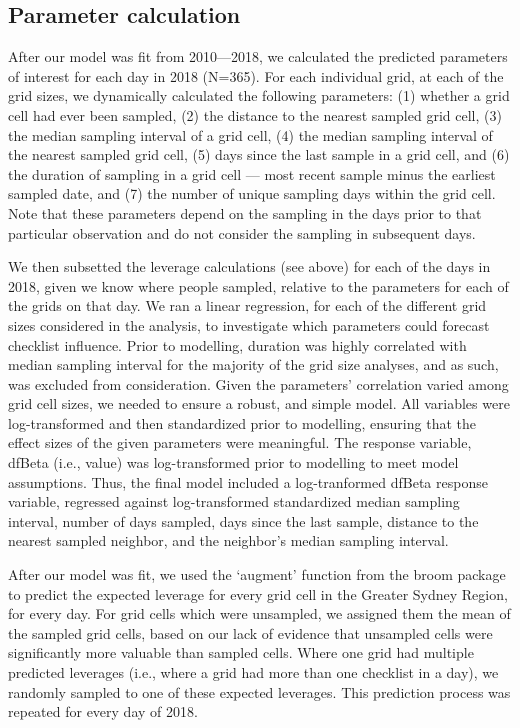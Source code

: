 \documentclass[9pt,twocolumn,twoside,lineno]{pnas-new}
\begin{document}
{\subsection*{Parameter calculation} After our model was fit from 2010---2018, we calculated the predicted parameters of interest for each day in 2018 (N=365). For each individual grid, at each of the grid sizes, we dynamically calculated the following parameters: (1) whether a grid cell had ever been sampled, (2) the distance to the nearest sampled grid cell, (3) the median sampling interval of a grid cell, (4) the median sampling interval of the nearest sampled grid cell, (5) days since the last sample in a grid cell, and (6) the duration of sampling in a grid cell --- most recent sample minus the earliest sampled date, and (7) the number of unique sampling days within the grid cell.  Note that  these parameters depend on the sampling in the days prior to that particular observation and do not consider the sampling in subsequent days.  

We then subsetted the leverage calculations (see above) for each of the days in 2018, given we know where people sampled, relative to the parameters for each of the grids on that day. We ran a linear regression, for each of the different grid sizes considered in the analysis, to investigate which parameters could forecast checklist influence. Prior to modelling, duration was highly correlated with median sampling interval for the majority of the grid size analyses, and as such, was excluded from consideration. Given the parameters' correlation varied among grid cell sizes, we needed to ensure a robust, and simple model. All variables were log-transformed and then standardized prior to modelling, ensuring that the effect sizes of the given parameters were meaningful. The response variable, dfBeta (i.e., value) was log-transformed prior to modelling to meet model assumptions. Thus, the final model included a log-tranformed dfBeta response variable, regressed against log-transformed standardized median sampling interval, number of days sampled, days since the last sample, distance to the nearest sampled neighbor, and the neighbor's median sampling interval.

After our model was fit, we used the `augment' function from the broom package \cite{robinson2018broom} to predict the expected leverage for every grid cell in the Greater Sydney Region, for every day. For grid cells which were unsampled, we assigned them the mean of the sampled grid cells, based on our lack of evidence that unsampled cells were significantly more valuable than sampled cells. Where one grid had multiple predicted leverages (i.e., where a grid had more than one checklist in a day), we randomly sampled to one of these expected leverages. This prediction process was repeated for every day of 2018.

}
\end{document}
